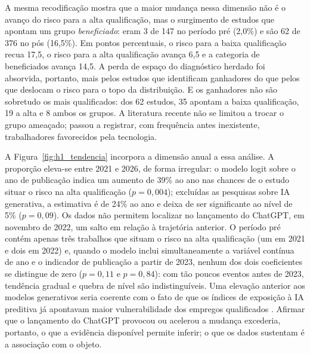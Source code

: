 A mesma recodificação mostra que a maior mudança nessa dimensão não é o avanço do risco para a alta qualificação, mas o surgimento de estudos que apontam um grupo \emph{beneficiado}: eram 3 de 147 no período pré (2,0\%) e são 62 de 376 no pós (16,5\%). Em pontos percentuais, o risco para a baixa qualificação recua 17,5, o risco para a alta qualificação avança 6,5 e a categoria de beneficiados avança 14,5. A perda de espaço do diagnóstico herdado foi absorvida, portanto, mais pelos estudos que identificam ganhadores do que pelos que deslocam o risco para o topo da distribuição. E os ganhadores não são sobretudo os mais qualificados: dos 62 estudos, 35 apontam a baixa qualificação, 19 a alta e 8 ambos os grupos. A literatura recente não se limitou a trocar o grupo ameaçado; passou a registrar, com frequência antes inexistente, trabalhadores favorecidos pela tecnologia.

\begin{table}[htbp]
\centering
\caption{Grupo atingido (rótulo original do extrator) e sinal do efeito sobre o emprego.}
\label{tab:polarizacao_sinal}
{\small}
\end{table}

A Figura~\ref{fig:h1_tendencia} incorpora a dimensão anual a essa análise. A proporção eleva-se entre 2021 e 2026, de forma irregular: o modelo logit sobre o ano de publicação indica um aumento de 39\% ao ano nas chances de o estudo situar o risco na alta qualificação ($p = 0{,}004$); excluídas as pesquisas sobre IA generativa, a estimativa é de 24\% ao ano e deixa de ser significante ao nível de 5\% ($p = 0{,}09$). Os dados não permitem localizar no lançamento do ChatGPT, em novembro de 2022, um salto em relação à trajetória anterior. O período pré contém apenas três trabalhos que situam o risco na alta qualificação (um em 2021 e dois em 2022) e, quando o modelo inclui simultaneamente a variável contínua de ano e o indicador de publicação a partir de 2023, nenhum dos dois coeficientes se distingue de zero ($p = 0{,}11$ e $p = 0{,}84$): com tão poucos eventos antes de 2023, tendência gradual e quebra de nível são indistinguíveis. Uma elevação anterior aos modelos generativos seria coerente com o fato de que os índices de exposição à IA preditiva já apontavam maior vulnerabilidade dos empregos qualificados \parencite{webb2020, felten2021}. Afirmar que o lançamento do ChatGPT provocou ou acelerou a mudança excederia, portanto, o que a evidência disponível permite inferir; o que os dados sustentam é a associação com o objeto.

